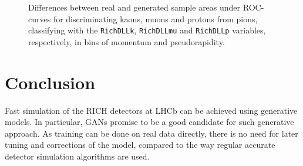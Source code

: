 \documentclass[a4paper]{jpconf}
\begin{document}
\begin{figure}
    \centering
    \caption{Differences between real and generated sample areas under ROC-curves for discriminating kaons, muons and protons from pions, classifying with the \texttt{RichDLLk}, \texttt{RichDLLmu} and \texttt{RichDLLp} variables, respectively, in bins of momentum and pseudorapidity.}
    \label{fig:DAUC}
\end{figure}

\section{Conclusion}

Fast simulation of the RICH detectors at LHCb can be achieved using generative models. In particular, GANs promise to be a good candidate for such generative approach. As training can be done on real data directly, there is no need for later tuning and corrections of the model, compared to the way regular accurate detector simulation algorithms are used.
\end{document}
